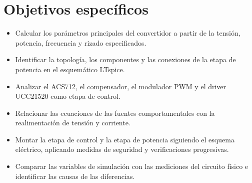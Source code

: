 \documentclass[12pt]{article}
\begin{document}
\section{Objetivos específicos}
\begin{itemize}
\item Calcular los parámetros principales del convertidor a partir de la tensión, potencia, frecuencia y rizado especificados.
\item Identificar la topología, los componentes y las conexiones de la etapa de potencia en el esquemático LTspice.
\item Analizar el ACS712, el compensador, el modulador PWM y el driver UCC21520 como etapa de control.
\item Relacionar las ecuaciones de las fuentes comportamentales con la realimentación de tensión y corriente.
\item Montar la etapa de control y la etapa de potencia siguiendo el esquema eléctrico, aplicando medidas de seguridad y verificaciones progresivas.
\item Comparar las variables de simulación con las mediciones del circuito físico e identificar las causas de las diferencias.
\end{itemize}
\end{document}
